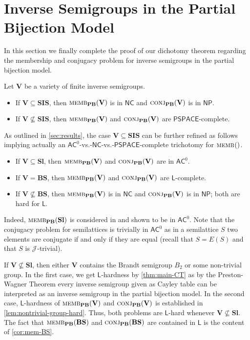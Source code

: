 \documentclass[anonymous,letter,UKenglish,cleveref,autoref,thm-restate]{lipics-v2021}
\newcommand{\sse}{\subseteq}
\newcommand{\ACz}{\ensuremath{\mathsf{AC}^0}\xspace}
\newcommand{\NC}{\ensuremath{\mathsf{NC}}\xspace}
\newcommand{\LOGSPACE}{\ensuremath{\mathsf{L}}\xspace}
\newcommand{\NP}{\ensuremath{\mathsf{NP}}\xspace}
\newcommand{\PSPACE}{\ensuremath{\mathsf{PSPACE}}\xspace}
\newcommand{\vV}{\ensuremath{\mathbf{V}}}
\newcommand{\vSl}{\ensuremath{\mathbf{Sl}}}
\newcommand{\vSI}{\ensuremath{\mathbf{SIS}}}
\newcommand{\vBS}{\ensuremath{\mathbf{BS}}}  \newcommand{\vBM}{\ensuremath{\mathbf{BM}}}
\newcommand*{\gJ}[1][]{\mathrel{\mathcal{J}_{#1}}}
\theoremstyle{plain}
\theoremstyle{plain}
\newcommand{\dMemb}[2][]{\textup{\textsc{memb${}_{\mathbf{#1}}\expandafter\ifx\expandafter\relax\detokenize{#2}\relax\else(#2)\fi$}}}
\newcommand{\dConj}[2][]{\textup{\textsc{conj${}_{\mathbf{#1}}\expandafter\ifx\expandafter\relax\detokenize{#2}\relax\else(#2)\fi$}}}
\begin{document}
\section{Inverse Semigroups in the Partial Bijection Model}\label{sec:PSPACE-hard}

In this section we finally complete the proof of our dichotomy theorem regarding the membership and conjugacy problem for inverse semigroups in the partial bijection model.


\begin{theorem}\label{thm:pbm-dichotomy}
	Let $\vV$ be a variety of finite inverse semigroups. 
	\begin{itemize}
		\item If $\vV \sse \vSI$, then $\dMemb[PB]{\vV} $ is in \NC and $\dConj[PB]{\vV}$ is in \NP.
		\item If $\vV \not\sse \vSI$, then $\dMemb[PB]{\vV}$ and $\dConj[PB]{\vV}$ are \PSPACE-complete.
	\end{itemize}
\end{theorem}

As outlined in \cref{sec:results}, the case $\vV \sse \vSI$ can be further refined as follows implying actually an \ACz-vs.-\NC-vs.-\PSPACE-complete trichotomy for $\dMemb{}$.
\begin{itemize}
	\item If $\vV \sse \vSl$, then $\dMemb[PB]{\vV} $ and $\dConj[PB]{\vV}$ are in \ACz.
	\item If $\vV = \vBS$, then $\dMemb[PB]{\vV} $ and $\dConj[PB]{\vV}$ are \LOGSPACE-complete.
	\item If $\vV \not\sse \vBS$, then $\dMemb[PB]{\vV} $ is in \NC and $\dConj[PB]{\vV}$ is in \NP; both are hard for \LOGSPACE.
\end{itemize}

Indeed, $\dMemb[PB]{\vSl} $ is considered in  \cite{BeaudryMT92} and shown to be in \ACz.
Note that the conjugacy problem for semilattices is trivially in \ACz as in a semilattice $S$ two elements are conjugate if and only if they are equal (recall that $S = E(S)$ and that $S$ is $\gJ$-trivial).

If $\vV \not\sse \vSl$, then either $\vV$ contains the Brandt semigroup $B_2$ or some non-trivial group. 
In the first case, we get \LOGSPACE-hardness by \cref{thm:main-CT} as by the Preston-Wagner Theorem \cite{Preston54,Wagner52} every inverse semigroup given as Cayley table can be interpreted as an inverse semigroup in the partial bijection model.
In the second case, \LOGSPACE-hardness of $\dMemb[PB]{\vV} $ and $\dConj[PB]{\vV}$ is established in \cref{lem:nontrivial-group-hard}.
Thus, both problems are \LOGSPACE-hard whenever $\vV \not\sse \vSl$.
The fact that $\dMemb[PB]{\vBS}$ and $\dConj[PB]{\vBS}$ are contained in \LOGSPACE is the content of \cref{cor:mem-BS}.
\end{document}
